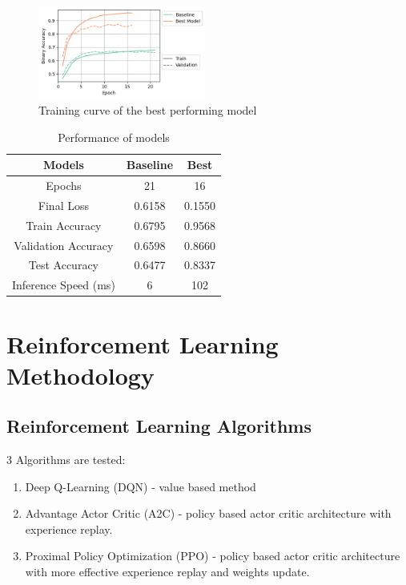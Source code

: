 \documentclass[conference]{IEEEtran}
\begin{document}
\begin{figure}
    \centering
    \includegraphics[width=0.49\textwidth]{final_model_accuracy.png}
    \caption{Training curve of the best performing model}
    \label{fig:final_model_accuracy}
\end{figure}

\begin{table}
    \centering
    \caption{Performance of models}
    \begin{tabular}{| c | c | c |}
        \toprule
        Models & Baseline & Best \\
        \midrule
        Epochs & 21 & 16 \\
        \midrule
        Final Loss & 0.6158 & 0.1550 \\
        \midrule
        Train Accuracy & 0.6795 & 0.9568 \\
        \midrule
        Validation Accuracy & 0.6598 & 0.8660 \\
        \midrule
        Test Accuracy & 0.6477 & 0.8337 \\
        \midrule
        Inference Speed (ms) & 6 & 102 \\
        \bottomrule
    \end{tabular}
    \label{tab:final_model_accuracy}
\end{table}

\section{Reinforcement Learning Methodology}

\subsection{Reinforcement Learning Algorithms}

3 Algorithms are tested:

\begin{enumerate}
    \item Deep Q-Learning (DQN) - value based method
    \item Advantage Actor Critic (A2C) - policy based actor critic architecture with experience replay.
    \item Proximal Policy Optimization (PPO) - policy based actor critic architecture with more effective experience replay and weights update.
\end{enumerate}
\end{document}
